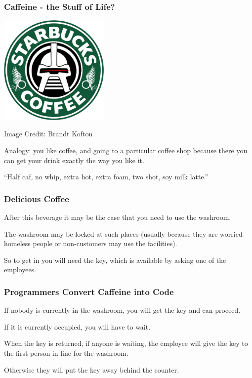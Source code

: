 \begin{frame}
	\frametitle{Caffeine - the Stuff of Life?}

	\begin{center}
		\includegraphics[width=0.4\textwidth]{images/starbucks.jpg}
	\end{center}
	\hfill Image Credit: Brandt Kofton


	Analogy: you like coffee, and going to a particular coffee shop because there you can get your drink exactly the way you like it.

	``Half caf, no whip, extra hot, extra foam, two shot, soy milk latte.''

\end{frame}

\begin{frame}
	\frametitle{Delicious Coffee}

	After this beverage it may be the case that you need to use the washroom.

	The washroom may be locked at such places (usually because they are worried homeless people or non-customers may use the facilities).

	So to get in you will need the key, which is available by asking one of the employees.

\end{frame}

\begin{frame}
	\frametitle{Programmers Convert Caffeine into Code}

	If nobody is currently in the washroom, you will get the key and can proceed.

	If it is currently occupied, you will have to wait.

	When the key is returned, if anyone is waiting, the employee will give the key to the first person in line for the washroom.

	Otherwise they will put the key away behind the counter.


\end{frame}

